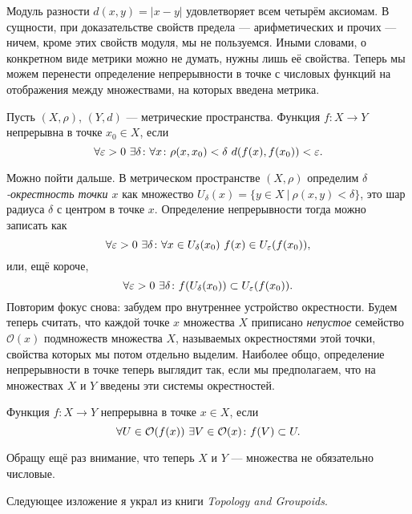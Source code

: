 Модуль разности $d(x,y)=|x-y|$ удовлетворяет всем четырём аксиомам. В сущности, при доказательстве свойств предела --- арифметических и прочих --- ничем, кроме этих свойств модуля, мы не пользуемся. Иными словами, о конкретном виде метрики можно не думать, нужны лишь её свойства. Теперь мы можем перенести определение непрерывности в точке с числовых функций на отображения между множествами, на которых введена метрика.
\begin{defin}
	Пусть $(X,\rho)$, $(Y,d)$ --- метрические пространства. Функция $f\colon X\to Y$ непрерывна в точке $x_0\in X$, если
	\begin{equation}
		\forall\varepsilon>0\ \exists\delta\such\forall x\such \rho(x,x_0)<\delta\ d(f(x),f(x_0))<\varepsilon.
	\end{equation}
\end{defin}
Можно пойти дальше. В метрическом пространстве $(X,\rho)$ определим \textit{$\delta$-окрестность точки $x$} как множество $U_{\delta}(x)=\{y\in X\ |\ \rho(x,y)<\delta\}$, это шар радиуса $\delta$ с центром в точке $x$. Определение непрерывности тогда можно записать как
	\begin{equation}
		\forall\varepsilon>0\ \exists\delta\such\forall x\in U_{\delta}(x_0)\ f(x)\in U_{\varepsilon}(f(x_0)),
	\end{equation}
или, ещё короче,
	\begin{equation}
		\forall\varepsilon>0\ \exists\delta\colon f(U_{\delta}(x_0))\subset U_{\varepsilon}(f(x_0)).
	\end{equation}
Повторим фокус снова: забудем про внутреннее устройство окрестности. Будем теперь считать, что каждой точке $x$ множества $X$ приписано \textit{непустое} семейство $\mathcal{O}(x)$ подмножеств множества $X$, называемых окрестностями этой точки, свойства которых мы потом отдельно выделим. Наиболее общо, определение непрерывности в точке теперь выглядит так, если мы предполагаем, что на множествах $X$ и $Y$ введены эти системы окрестностей.
\begin{defin}
	Функция $f\colon X\to Y$ непрерывна в точке $x\in X$, если
	\begin{equation}
		\forall U\in\mathcal{O}(f(x))\ \exists V\in\mathcal{O}(x)\colon f(V)\subset U.
	\end{equation}
\end{defin}
Обращу ещё раз внимание, что теперь $X$ и $Y$ --- множества не обязательно числовые.

Следующее изложение я украл из книги \textit{Topology and Groupoids}.

